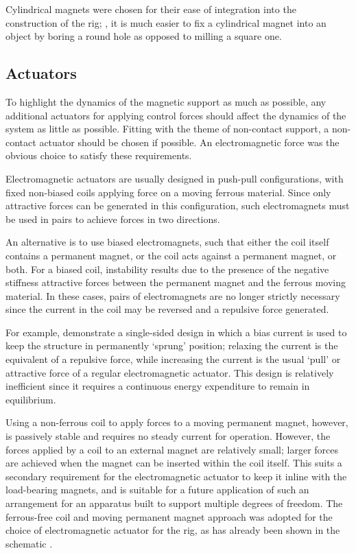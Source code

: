 \documentclass[11pt,a4paper]{memoir}
\begin{document}
Cylindrical magnets were chosen for their ease of integration into the
construction of the rig; \eg, it is much easier to fix a cylindrical magnet
into an object by boring a round hole as opposed to milling a square one.

\subsection{Actuators}

To highlight the dynamics of the magnetic support as much as possible, any
additional actuators for applying control forces should affect the dynamics of
the system as little as possible. Fitting with the theme of non-contact
support, a non-contact actuator should be chosen if possible. An
electromagnetic force was the obvious choice to satisfy these requirements.

Electromagnetic actuators are usually designed in push-pull configurations,
with fixed non-biased coils applying force on a moving ferrous material. Since
only attractive forces can be generated in this configuration, such
electromagnets must be used in pairs to achieve forces in two directions.

An alternative is to use biased electromagnets, such that either the coil
itself contains a permanent magnet, or the coil acts against a permanent
magnet, or both. For a biased coil, instability results due to the presence of
the negative stiffness attractive forces between the permanent magnet and the
ferrous moving material. In these cases, pairs of electromagnets are no longer
strictly necessary since the current in the coil may be reversed and a
repulsive force generated.

For example, \textcite{nandi2009} demonstrate a single-sided design in which a
bias current is used to keep the structure in permanently `sprung' position;
relaxing the current is the equivalent of a repulsive force, while increasing
the current is the usual `pull' or attractive force of a regular
electromagnetic actuator. This design is relatively inefficient since it
requires a continuous energy expenditure to remain in equilibrium.

Using a non-ferrous coil to apply forces to a moving permanent magnet,
however, is passively stable and requires no steady current for operation.
However, the forces applied by a coil to an external magnet are relatively
small; larger forces are achieved when the magnet can be inserted within the
coil itself. This suits a secondary requirement for the electromagnetic
actuator to keep it inline with the load-bearing magnets, and is suitable for a
future application of such an arrangement for an apparatus built to support
multiple degrees of freedom. The ferrous-free coil and moving permanent magnet
approach was adopted for the choice of electromagnetic actuator for the rig,
as has already been shown in the schematic .
\end{document}
